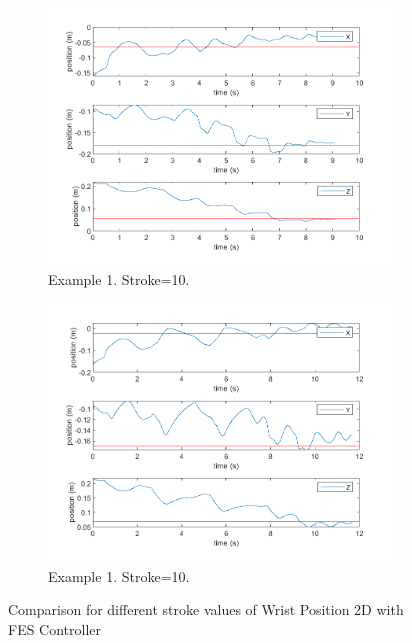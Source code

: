 \begin{figure}[ht]
    \vspace{2pt} %
        \begin{subfigure}[b]{0.45\textwidth}
        \centering
        \includegraphics[width=\linewidth]{Pictures/Results/Controller/Stroke10/6.png}
        \caption{Example 1. Stroke=10.}
    \end{subfigure}%
    \hfill
    \begin{subfigure}[b]{0.45\textwidth}
        \centering
        \includegraphics[width=\linewidth]{Pictures/Results/Controller/Stroke10/20.png}
        \caption{Example 1. Stroke=10.}
    \end{subfigure}
  
    \caption{Comparison for different stroke values of Wrist Position 2D with FES Controller}

\end{figure}
    


